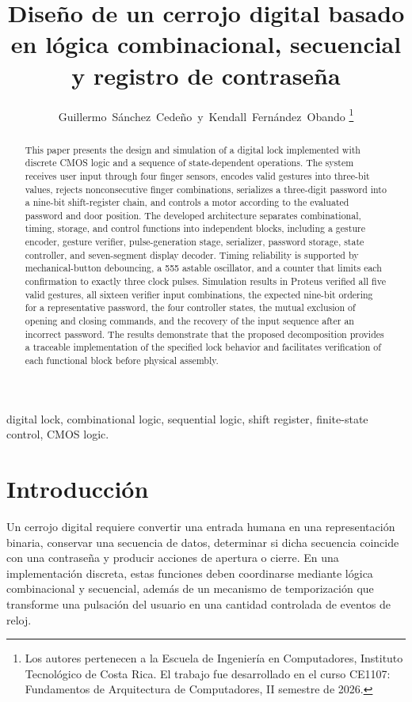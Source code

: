 \documentclass[10pt,journal]{IEEEtran}
\begin{document}
\title{Diseño de un cerrojo digital basado en lógica combinacional, secuencial y registro de contraseña}

\author{Guillermo~Sánchez~Cedeño~y~Kendall~Fernández~Obando%
\thanks{Los autores pertenecen a la Escuela de Ingeniería en Computadores, Instituto Tecnológico de Costa Rica. El trabajo fue desarrollado en el curso CE1107: Fundamentos de Arquitectura de Computadores, II semestre de 2026.}%
}

\maketitle

\begin{abstract}
This paper presents the design and simulation of a digital lock implemented with discrete CMOS logic and a sequence of state-dependent operations. The system receives user input through four finger sensors, encodes valid gestures into three-bit values, rejects nonconsecutive finger combinations, serializes a three-digit password into a nine-bit shift-register chain, and controls a motor according to the evaluated password and door position. The developed architecture separates combinational, timing, storage, and control functions into independent blocks, including a gesture encoder, gesture verifier, pulse-generation stage, serializer, password storage, state controller, and seven-segment display decoder. Timing reliability is supported by mechanical-button debouncing, a 555 astable oscillator, and a counter that limits each confirmation to exactly three clock pulses. Simulation results in Proteus verified all five valid gestures, all sixteen verifier input combinations, the expected nine-bit ordering for a representative password, the four controller states, the mutual exclusion of opening and closing commands, and the recovery of the input sequence after an incorrect password. The results demonstrate that the proposed decomposition provides a traceable implementation of the specified lock behavior and facilitates verification of each functional block before physical assembly.
\end{abstract}

\begin{IEEEkeywords}
digital lock, combinational logic, sequential logic, shift register, finite-state control, CMOS logic.
\end{IEEEkeywords}

\section{Introducción}
Un cerrojo digital requiere convertir una entrada humana en una representación binaria, conservar una secuencia de datos, determinar si dicha secuencia coincide con una contraseña y producir acciones de apertura o cierre. En una implementación discreta, estas funciones deben coordinarse mediante lógica combinacional y secuencial, además de un mecanismo de temporización que transforme una pulsación del usuario en una cantidad controlada de eventos de reloj.
\end{document}
